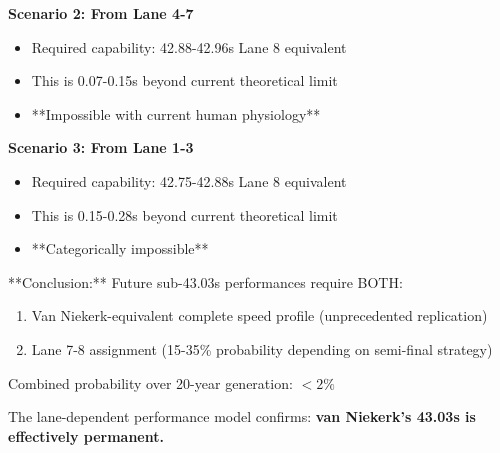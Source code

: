 \textbf{Scenario 2: From Lane 4-7}
\begin{itemize}
    \item Required capability: 42.88-42.96s Lane 8 equivalent
    \item This is 0.07-0.15s beyond current theoretical limit
    \item **Impossible with current human physiology**
\end{itemize}

\textbf{Scenario 3: From Lane 1-3}
\begin{itemize}
    \item Required capability: 42.75-42.88s Lane 8 equivalent
    \item This is 0.15-0.28s beyond current theoretical limit
    \item **Categorically impossible**
\end{itemize}

**Conclusion:** Future sub-43.03s performances require BOTH:
\begin{enumerate}
    \item Van Niekerk-equivalent complete speed profile (unprecedented replication)
    \item Lane 7-8 assignment (15-35\% probability depending on semi-final strategy)
\end{enumerate}

Combined probability over 20-year generation: $< 2\%$

The lane-dependent performance model confirms: \textbf{van Niekerk's 43.03s is effectively permanent.}
